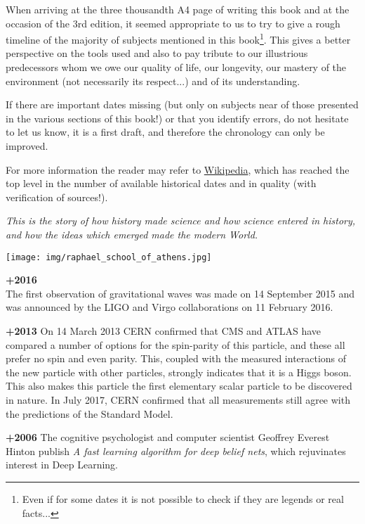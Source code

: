 When arriving at the three thousandth A4 page of writing this book and at the occasion of the 3rd edition, it seemed appropriate to us to try to give a rough timeline of the majority of subjects mentioned in this book\footnote{Even if for some dates it is not possible to check if they are legends or real facts...}. This gives a better perspective on the tools used and also to pay tribute to our illustrious predecessors whom we owe our quality of life, our longevity, our mastery of the environment (not necessarily its respect...) and of its understanding.

If there are important dates missing (but only on subjects near of those presented in the various sections of this book!) or that you identify errors, do not hesitate to let us know, it is a first draft, and therefore the chronology can only be improved.

For more information the reader may refer to \href{http://www.wikipedia.com}{{\color{blue} Wikipedia}}, which has reached the top level in the number of available historical dates and in quality (with verification of sources!).

\begin{center}
\textit{This is the story of how history made science and how science entered in history, and how the ideas which emerged made the modern World.}
\end{center}

\texttt{[image: img/raphael\_school\_of\_athens.jpg]}

\textbf{+2016}\\
The first observation of gravitational waves was made on 14 September 2015 and was announced by the LIGO and Virgo collaborations on 11 February 2016.

\textbf{+2013}
On 14 March 2013 CERN confirmed that CMS and ATLAS have compared a number of options for the spin-parity of this particle, and these all prefer no spin and even parity. This, coupled with the measured interactions of the new particle with other particles, strongly indicates that it is a Higgs boson. This also makes this particle the first elementary scalar particle to be discovered in nature. In July 2017, CERN confirmed that all measurements still agree with the predictions of the Standard Model.

\textbf{+2006}
The  cognitive psychologist and computer scientist Geoffrey Everest Hinton publish \textit{A fast learning algorithm for deep belief nets}, which rejuvinates interest in Deep Learning. 

